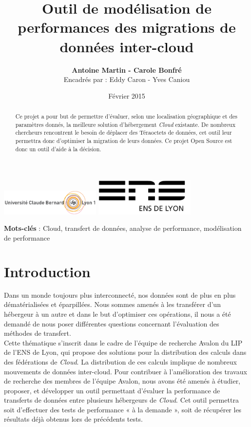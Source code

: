 \documentclass[10pt]{article}
\title{\Huge{Outil de modélisation de performances 
des migrations de données inter-cloud}}
\author{\textbf{Antoine Martin - Carole Bonfré}\\Encadrés par : Eddy Caron - Yves Caniou}
\date{Février 2015}
\begin{document}
\maketitle

\begin{center}
\includegraphics[width=5cm]{logo-lyon1.png} \hfill
\includegraphics[width=5cm]{logo-ens.png}  
\end{center}



\begin{abstract}
Ce projet a pour but de permettre d'évaluer, selon une
localisation géographique et des paramètres donnés, la meilleure solution
d'hébergement \textit{Cloud} existante. De nombreux chercheurs rencontrent le
besoin de déplacer des Téraoctets de données, cet outil leur permettra donc
d'optimiser la migration de leurs données. Ce projet Open Source
est donc un outil d'aide à la décision.
\end{abstract}

\textbf{Mots-clés} : Cloud, transfert de données, analyse de performance, modélisation de performance


\section{Introduction}

Dans un monde toujours plus interconnecté, nos données sont de plus en plus
dématérialisées et éparpillées. Nous sommes amenés à les transférer d’un
hébergeur à un autre et dans le but d’optimiser ces opérations, il nous a été
demandé de nous poser différentes questions concernant l’évaluation des
méthodes de transfert.\\

Cette thématique s’inscrit dans le cadre de l’équipe
de recherche Avalon du LIP de l’ENS de Lyon, qui propose des solutions pour la
distribution des calculs dans des fédérations de \textit{Cloud}. La
distribution de ces calculs implique de nombreux mouvements de données
inter-cloud. Pour contribuer à l’amélioration des travaux de recherche des
membres de l’équipe Avalon, nous avons été amenés à étudier, proposer, et
développer un outil permettant d’évaluer la performance de transferts de
données entre plusieurs hébergeurs de \textit{Cloud}. Cet outil permettra soit
d’effectuer des tests de performance « à la demande », soit de récupérer les
résultats déjà obtenus lors de précédents tests.\\
\end{document}
